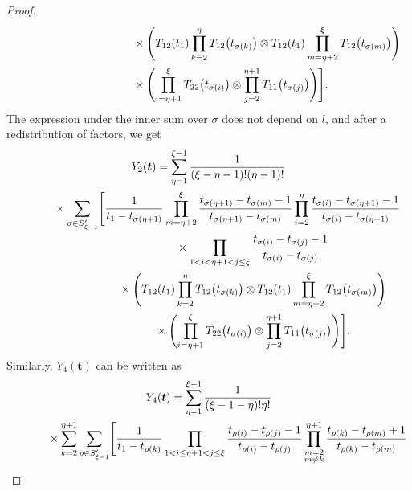 \documentclass[10pt,a4paper]{amsart}
\numberwithin{equation}{section}
\begin{document}
\begin{proof}
\begin{gather*}
\begin{split}
&\hphantom{Y_2(\boldsymbol{t})=\times\sum_{l=\eta+1}^\xi \sum_{\sigma\in S_{\xi-1}'} \Biggl[}{}
\times\Biggl( T_{12} (t_1)\prod_{k=2}^{\eta} T_{12} \bigl(t_{\sigma(k)}\bigr) \otimes T_{12}(t_1) \prod_{m=\eta+2}^\xi T_{12} \bigl(t_{\sigma(m)}\bigr)\Biggr)\\
&\hphantom{Y_2(\boldsymbol{t})=\times\sum_{l=\eta+1}^\xi \sum_{\sigma\in S_{\xi-1}'} \Biggl[}{}
 \times\Biggl( \prod_{i=\eta+1}^{\xi } T _{22}\bigl(t_{\sigma(i)}\bigr)\otimes \prod_{j=2}^{\eta+1} T _{11}\bigl(t_{\sigma(j)}\bigr)\Biggr) \Biggr].
 \end{split}
\end{gather*}
The expression under the inner sum over $\sigma$ does not depend on $l$, and after a redistribution of factors, we get
\begin{gather}
Y_2(\boldsymbol{t})= \sum_{\eta=1}^{\xi-1} \frac{1}{(\xi-\eta-1) ! (\eta-1)!} \nonumber\\
\hphantom{Y_2(\boldsymbol{t})=}{}
\times \sum_{\sigma\in S_{\xi-1}'}\Biggl[ \frac{1}{t_1-t_{\sigma(\eta+1)}}\prod_{m=\eta+2}^\xi \frac{t_{\sigma(\eta+1)}-t_{\sigma(m)}-1}{t_{\sigma(\eta+1)}-t_{\sigma(m)}}\prod_{i=2}^\eta \frac{t_{\sigma(i)}-t_{\sigma(\eta+1)}-1}{t_{\sigma(i)}-t_{\sigma(\eta+1)}} \nonumber\\
\hphantom{Y_2(\boldsymbol{t})=\times \sum_{\sigma\in S_{\xi-1}'}\Biggl[}{}
\times\prod_{1< i<\eta+1<j \leq \xi} \frac{t_{\sigma(i)}-t_{\sigma(j)}-1}{t_{\sigma(i)}-t_{\sigma(j)}}\nonumber\\
\hphantom{Y_2(\boldsymbol{t})=\times \sum_{\sigma\in S_{\xi-1}'}\Biggl[}{}
\times \Biggl( T_{12} (t_1)\prod_{k=2}^{\eta} T_{12} \bigl(t_{\sigma(k)}\bigr) \otimes T_{12}(t_1) \prod_{m=\eta+2}^\xi T_{12} \bigl(t_{\sigma(m)}\bigr)\Biggr) \nonumber\\
\hphantom{Y_2(\boldsymbol{t})=\times\sum_{\sigma\in S_{\xi-1}'}\Biggl[}{}
\times\Biggl( \prod_{i=\eta+1}^{\xi } T _{22}\bigl(t_{\sigma(i)}\bigr)\otimes \prod_{j=2}^{\eta+1} T _{11}\bigl(t_{\sigma(j)}\bigr)\Biggr) \Biggr].\label{final2}
\end{gather}
Similarly, $Y_4(\boldsymbol{t})$ can be written as
\begin{gather*}
Y_4(\boldsymbol{t})= \sum_{\eta=1}^{\xi-1} \frac{1}{(\xi-1-\eta) ! \eta!} \\
\hphantom{Y_4(\boldsymbol{t})= }{}
\times\sum_{k=2}^{\eta+1} \sum_{\rho\in S_{\xi-1}'} \Biggl[ \frac{1}{t_1-t_{\rho(k)}} \prod_{1< i\leq\eta+1<j \leq \xi} \frac{t_{\rho(i)}-t_{\rho(j)}-1}{t_{\rho(i)}-t_{\rho(j)}} \prod_{\substack{m=2\\m\neq k}}^{\eta+1} \frac{t_{\rho(k)}-t_{\rho(m)}+1}{t_{\rho(k)}-t_{\rho(m)}} \\

\end{gather*}
\end{proof}
\end{document}
